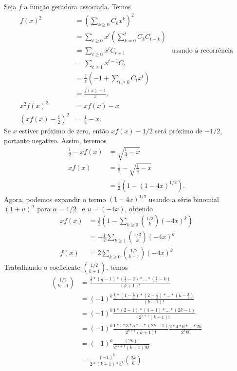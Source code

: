 Seja $f$ a função geradora associada.
Temos
\begin{align*}
    f(x)^2 &= \left(\sum_{k \geq 0} C_k x^k\right)^2 \\
           &= \sum_{t \geq 0} x^t \left( \sum_{k = 0}^t C_k C_{t-k} \right) \\
           &= \sum_{t \geq 0} x^t C_{t+1}
            & \text{usando a recorrência}\\
           &= \sum_{t \geq 1} x^{t-1} C_t \\
           &= \frac 1 x \left( -1 + \sum_{t \geq 0} C_t x^t \right) \\
           &= \frac{f(x) - 1}{x}. \\
    x^2 f(x)^2 &= xf(x) - x \\
    \left(xf(x) - \frac 1 2\right)^2 &= \frac 1 4 - x.
\end{align*}
Se $x$ estiver próximo de zero,
então $xf(x) - 1/2$ será próximo de $-1/2$,
portanto negativo.
Assim, teremos
\begin{align*}
    \frac 1 2 - xf(x) &= \sqrt{\frac 1 4 - x} \\
    xf(x) &= \frac 1 2 - \sqrt{\frac 1 4 - x} \\
          &= \frac 1 2 (1 - (1 - 4x)^{1/2}).
\end{align*}
Agora, podemos expandir o termo $(1 - 4x)^{1/2}$
usando a série binomial $(1 + u)^\alpha$ para $\alpha = 1/2$~\cite[p.~487]{Spivak1994}
e $u = (-4x)$,
obtendo
\begin{align*}
    xf(x) &= \frac 1 2 \left( 1 - \sum_{k \geq 0} \binom{1/2}{k} (-4x)^k \right) \\
          &= -\frac 1 2 \sum_{k \geq 1} \binom{1/2}{k} (-4x)^k \\
    f(x) &= 2 \sum_{k \geq 0} \binom{1/2}{k+1} (-4x)^k
\end{align*}
Trabalhando o coeficiente $\binom{1/2}{k+1}$, temos
\begin{align*}
    \binom{1/2}{k+1} &= \frac{
        \frac 1 2 * (\frac 1 2 - 1) * (\frac 1 2 - 2) * \dots * (\frac 1 2 - k)
    }{ (k+1)! } \\
    &= (-1)^k \frac{
        \frac 1 2 * (1 - \frac 1 2) * (2 - \frac 1 2) * \dots * (k - \frac 1 2)
    }{ (k+1)! } \\
    &= (-1)^k \frac{
        1 * (2 - 1) * (4 - 1) * \dots * (2k - 1)
    }{ 2^{k + 1} (k + 1)! } \\
    &= (-1)^k \frac{ 1 * 1 * 3 * 5 * \dots * (2k - 1) }{2^{k+1} (k+1)!}
        \frac{2 * 4 * 6 * \dots * 2k}{2^k k!} \\
    &= (-1)^k \frac{ (2k)! }{2^{2k+1} (k+1)! k!} \\
    &= \frac{(-1)^k}{2 * (k+1) * 4^k} \binom{2k}{k}.
\end{align*}
